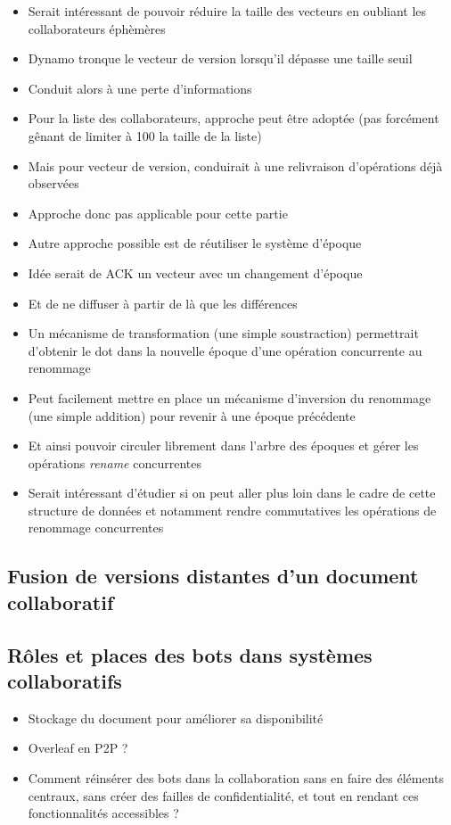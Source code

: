 \documentclass[12pt]{thesul}
\theoremstyle{definition}
\begin{document}
\begin{itemize}
  \item Serait intéressant de pouvoir réduire la taille des vecteurs en oubliant les collaborateurs éphèmères
  \item Dynamo\cite{2007-dynamo} tronque le vecteur de version lorsqu'il dépasse une taille seuil
  \item Conduit alors à une perte d'informations
  \item Pour la liste des collaborateurs, approche peut être adoptée (pas forcément gênant de limiter à 100 la taille de la liste)
  \item Mais pour vecteur de version, conduirait à une relivraison d'opérations déjà observées
  \item Approche donc pas applicable pour cette partie
  \item Autre approche possible est de réutiliser le système d'époque
  \item Idée serait de ACK un vecteur avec un changement d'époque
  \item Et de ne diffuser à partir de là que les différences
  \item Un mécanisme de transformation (une simple soustraction) permettrait d'obtenir le dot dans la nouvelle époque d'une opération concurrente au renommage
  \item Peut facilement mettre en place un mécanisme d'inversion du renommage (une simple addition) pour revenir à une époque précédente
  \item Et ainsi pouvoir circuler librement dans l'arbre des époques et gérer les opérations \emph{rename} concurrentes
  \item Serait intéressant d'étudier si on peut aller plus loin dans le cadre de cette structure de données et notamment rendre commutatives les opérations de renommage concurrentes
\end{itemize}

\subsection{Fusion de versions distantes d'un document collaboratif}

\subsection{Rôles et places des bots dans systèmes collaboratifs}
\begin{itemize}
  \item Stockage du document pour améliorer sa disponibilité
  \item Overleaf en P2P ?
  \item Comment réinsérer des bots dans la collaboration sans en faire des éléments centraux, sans créer des failles de confidentialité, et tout en rendant ces fonctionnalités accessibles ?
\end{itemize}
\end{document}
